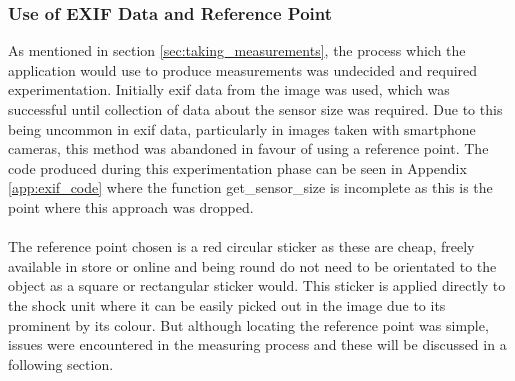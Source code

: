 		\subsubsection{Use of EXIF Data and Reference Point}
			As mentioned in section \ref{sec:taking_measurements}, the process which the application would use to produce measurements was undecided and required experimentation. Initially \gls{exif} data from the image was used, which was successful until collection of data about the sensor size was required. Due to this being uncommon in \gls{exif} data, particularly in images taken with smartphone cameras, this method was abandoned in favour of using a reference point. The code produced during this experimentation phase can be seen in Appendix \ref{app:exif_code} where the function {\ttfamily get\_sensor\_size} is incomplete as this is the point where this approach was dropped.
			\\\\
			The reference point chosen is a red circular sticker as these are cheap, freely available in store or online and being round do not need to be orientated to the object as a square or rectangular sticker would. This sticker is applied directly to the shock unit where it can be easily picked out in the image due to its prominent by its colour. But although locating the reference point was simple, issues were encountered in the measuring process and these will be discussed in a following section.
